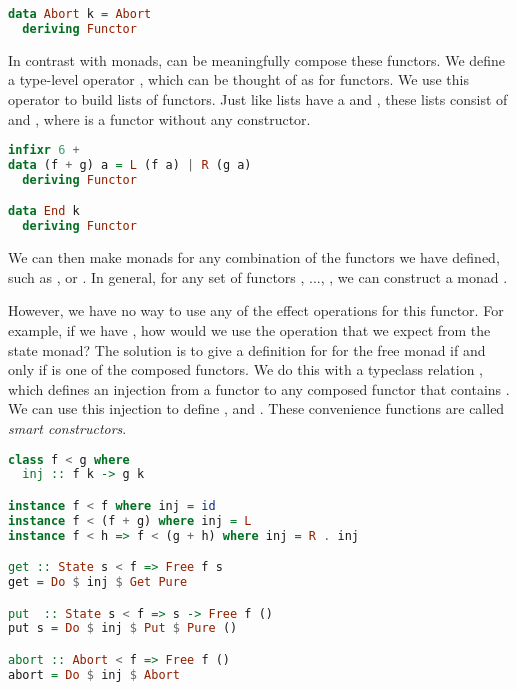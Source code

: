 \begin{lstlisting}[language=haskell,style=fancy]
data Abort k = Abort
  deriving Functor
\end{lstlisting}

In contrast with monads, can be meaningfully compose these functors. We define a type-level operator \hs{+}, which can be thought of as  for functors. We use this operator to build lists of functors. Just like lists have a  and , these lists consist of \hs{+} and , where  is a functor without any constructor.

\begin{lstlisting}[language=haskell,style=fancy]
infixr 6 +
data (f + g) a = L (f a) | R (g a)
  deriving Functor

data End k
  deriving Functor
\end{lstlisting}

We can then make monads for any combination of the functors we have defined, such as ,  or . In general, for any set of functors , ..., , we can construct a monad .

However, we have no way to use any of the effect operations for this functor. For example, if we have , how would we use the  operation that we expect from the state monad? The solution is to give a definition for  for the free monad if and only if  is one of the composed functors. We do this with a typeclass relation \hs{<}, which defines an injection from a functor  to any composed functor  that contains . We can use this injection to define ,  and . These convenience functions are called \emph{smart constructors}.

\begin{lstlisting}[language=haskell,style=fancy]
class f < g where
  inj :: f k -> g k

instance f < f where inj = id
instance f < (f + g) where inj = L
instance f < h => f < (g + h) where inj = R . inj

get :: State s < f => Free f s
get = Do $ inj $ Get Pure

put  :: State s < f => s -> Free f ()
put s = Do $ inj $ Put $ Pure ()

abort :: Abort < f => Free f ()
abort = Do $ inj $ Abort
\end{lstlisting}

